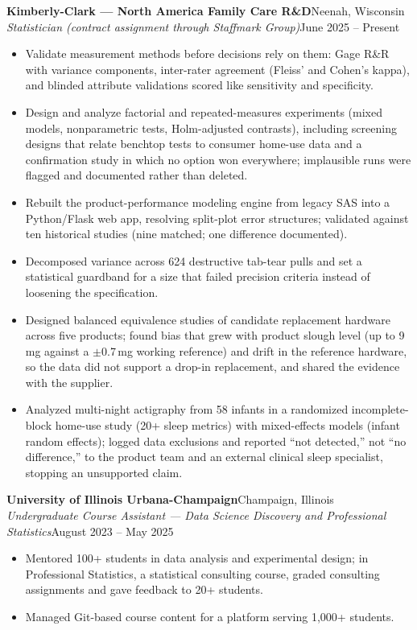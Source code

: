 \documentclass[letterpaper,10pt]{article}
\newcommand{\role}[4]{
    \Needspace{5\baselineskip}
    \vspace{1pt}
    \textbf{#1}\hfill #2\\
    \textit{#3}\hfill #4\\[-3pt]
}
\begin{document}
\role{Kimberly-Clark --- North America Family Care R\&D}{Neenah, Wisconsin}
{Statistician (contract assignment through Staffmark Group)}{June 2025 -- Present}
\begin{itemize}
  \item Validate measurement methods before decisions rely on them: Gage R\&R with variance components, inter-rater agreement (Fleiss' and Cohen's kappa), and blinded attribute validations scored like sensitivity and specificity.
  \item Design and analyze factorial and repeated-measures experiments (mixed models, nonparametric tests, Holm-adjusted contrasts), including screening designs that relate benchtop tests to consumer home-use data and a confirmation study in which no option won everywhere; implausible runs were flagged and documented rather than deleted.
  \item Rebuilt the product-performance modeling engine from legacy SAS into a Python/Flask web app, resolving split-plot error structures; validated against ten historical studies (nine matched; one difference documented).
  \item Decomposed variance across 624 destructive tab-tear pulls and set a statistical guardband for a size that failed precision criteria instead of loosening the specification.
  \item Designed balanced equivalence studies of candidate replacement hardware across five products; found bias that grew with product slough level (up to 9\,mg against a $\pm$0.7\,mg working reference) and drift in the reference hardware, so the data did not support a drop-in replacement, and shared the evidence with the supplier.
  \item Analyzed multi-night actigraphy from 58 infants in a randomized incomplete-block home-use study (20+ sleep metrics) with mixed-effects models (infant random effects); logged data exclusions and reported ``not detected,'' not ``no difference,'' to the product team and an external clinical sleep specialist, stopping an unsupported claim.
\end{itemize}

\role{University of Illinois Urbana-Champaign}{Champaign, Illinois}
{Undergraduate Course Assistant --- Data Science Discovery and Professional Statistics}{August 2023 -- May 2025}
\begin{itemize}
  \item Mentored 100+ students in data analysis and experimental design; in Professional Statistics, a statistical consulting course, graded consulting assignments and gave feedback to 20+ students.
  \item Managed Git-based course content for a platform serving 1,000+ students.
\end{itemize}
\end{document}
